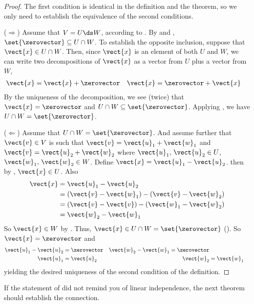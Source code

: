 %
\begin{proof}
The first condition is identical in the definition and the theorem, so we only need to establish the equivalence of the second conditions.\par
%
($\Rightarrow$)  
Assume that $V=U\ds W$, according to .   By  and , $\set{\zerovector}\subseteq U\cap W$.  To establish the opposite inclusion, suppose that $\vect{x}\in U\cap W$.  Then, since $\vect{x}$ is an element of both $U$ and $W$, we can write two decompositions of $\vect{x}$ as a vector from $U$ plus a vector from $W$,
%
\begin{align*}
\vect{x}&=\vect{x}+\zerovector
&
\vect{x}&=\zerovector+\vect{x}
\end{align*}
%
By the uniqueness of the decomposition, we see (twice) that $\vect{x}=\zerovector$ and $U\cap W\subseteq\set{\zerovector}$.  Applying , we have $U\cap W=\set{\zerovector}$.\par
%
($\Leftarrow$)  
Assume that $U\cap W=\set{\zerovector}$.  And assume further that $\vect{v}\in V$ is such that  $\vect{v}=\vect{u}_1+\vect{w}_1$ and $\vect{v}=\vect{u}_2+\vect{w}_2$ where $\vect{u}_1,\,\vect{u}_2\in U$, $\vect{w}_1,\,\vect{w}_2\in W$.  Define $\vect{x}=\vect{u}_1-\vect{u}_2$.  then by , $\vect{x}\in U$.  Also
%
\begin{align*}
\vect{x}
&=\vect{u}_1-\vect{u}_2\\
&=\left(\vect{v}-\vect{w}_1\right)-\left(\vect{v}-\vect{w}_2\right)\\
&=\left(\vect{v}-\vect{v}\right)-\left(\vect{w}_1-\vect{w}_2\right)\\
&=\vect{w}_2-\vect{w}_1
\end{align*}
%
So $\vect{x}\in W$ by .  Thus, $\vect{x}\in U\cap W =\set{\zerovector}$ ().  So $\vect{x}=\zerovector$ and 
%
\begin{align*}
\vect{u}_1-\vect{u}_2&=\zerovector & \vect{w}_2-\vect{w}_1 = \zerovector\\
\vect{u}_1&=\vect{u}_2 & \vect{w}_2&=\vect{w}_1\\
\end{align*}
%
yielding the desired uniqueness of the second condition of the definition.
\end{proof}
%
If the statement of  did not remind you of linear independence, the next theorem should establish the connection.

